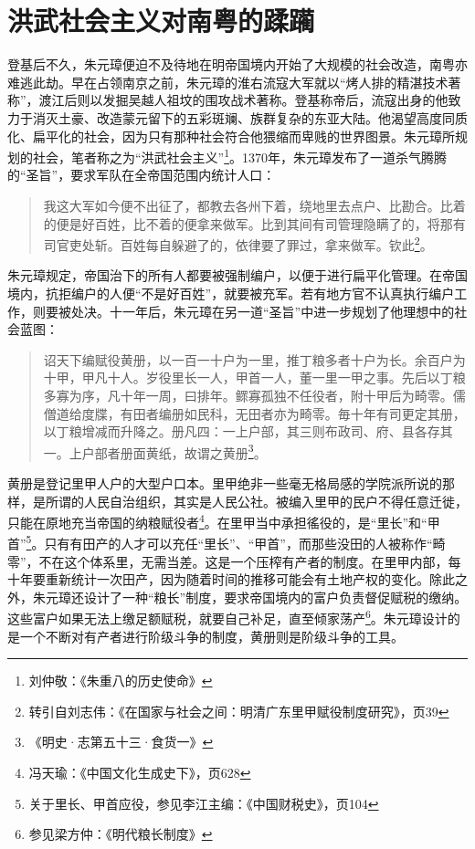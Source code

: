 \section{洪武社会主义对南粤的蹂躏}

\indent 登基后不久，朱元璋便迫不及待地在明帝国境内开始了大规模的社会改造，南粤亦难逃此劫。早在占领南京之前，朱元璋的淮右流寇大军就以“烤人排的精湛技术著称”，渡江后则以发掘吴越人祖坟的围攻战术著称。登基称帝后，流寇出身的他致力于消灭土豪、改造蒙元留下的五彩斑斓、族群复杂的东亚大陆。他渴望高度同质化、扁平化的社会，因为只有那种社会符合他猥缩而卑贱的世界图景。朱元璋所规划的社会，笔者称之为“洪武社会主义”\footnote{刘仲敬：《朱重八的历史使命》}。1370年，朱元璋发布了一道杀气腾腾的“圣旨”，要求军队在全帝国范围内统计人口：

\begin{quote}
我这大军如今便不出征了，都教去各州下着，绕地里去点户、比勘合。比着的便是好百姓，比不着的便拿来做军。比到其间有司管理隐瞒了的，将那有司官吏处斩。百姓每自躲避了的，依律要了罪过，拿来做军。钦此\footnote{转引自刘志伟：《在国家与社会之间：明清广东里甲赋役制度研究》，页39}。
\end{quote}

朱元璋规定，帝国治下的所有人都要被强制编户，以便于进行扁平化管理。在帝国境内，抗拒编户的人便“不是好百姓”，就要被充军。若有地方官不认真执行编户工作，则要被处决。十一年后，朱元璋在另一道“圣旨”中进一步规划了他理想中的社会蓝图：

\begin{quote}
	

诏天下编赋役黄册，以一百一十户为一里，推丁粮多者十户为长。余百户为十甲，甲凡十人。岁役里长一人，甲首一人，董一里一甲之事。先后以丁粮多寡为序，凡十年一周，曰排年。鳏寡孤独不任役者，附十甲后为畸零。儒僧道给度牒，有田者编册如民科，无田者亦为畸零。毎十年有司更定其册，以丁粮增减而升降之。册凡四：一上户部，其三则布政司、府、县各存其一。上户部者册面黄纸，故谓之黄册\footnote{《明史·志第五十三·食货一》}。

\end{quote}

黄册是登记里甲人户的大型户口本。里甲绝非一些毫无格局感的学院派所说的那样，是所谓的人民自治组织，其实是人民公社。被编入里甲的民户不得任意迁徙，只能在原地充当帝国的纳粮赋役者\footnote{冯天瑜：《中国文化生成史下》，页628}。在里甲当中承担徭役的，是“里长”和“甲首”\footnote{关于里长、甲首应役，参见李江主编：《中国财税史》，页104}。只有有田产的人才可以充任“里长”、“甲首”，而那些没田的人被称作“畸零”，不在这个体系里，无需当差。这是一个压榨有产者的制度。在里甲内部，每十年要重新统计一次田产，因为随着时间的推移可能会有土地产权的变化。除此之外，朱元璋还设计了一种“粮长”制度，要求帝国境内的富户负责督促赋税的缴纳。这些富户如果无法上缴足额赋税，就要自己补足，直至倾家荡产\footnote{参见梁方仲：《明代粮长制度》}。朱元璋设计的是一个不断对有产者进行阶级斗争的制度，黄册则是阶级斗争的工具。

